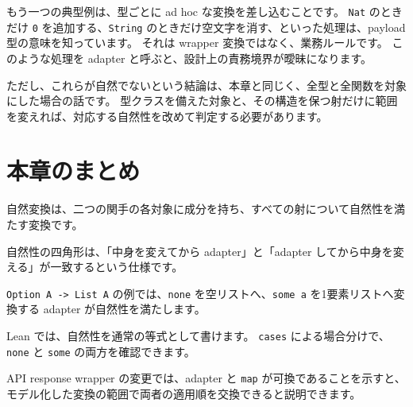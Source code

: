 もう一つの典型例は、型ごとに ad hoc な変換を差し込むことです。
\texttt{Nat} のときだけ \texttt{0} を追加する、\texttt{String} のときだけ空文字を消す、といった処理は、payload 型の意味を知っています。
それは wrapper 変換ではなく、業務ルールです。
このような処理を adapter と呼ぶと、設計上の責務境界が曖昧になります。

ただし、これらが自然でないという結論は、本章と同じく、全型と全関数を対象にした場合の話です。
型クラスを備えた対象と、その構造を保つ射だけに範囲を変えれば、対応する自然性を改めて判定する必要があります。

\section{本章のまとめ}

自然変換は、二つの関手の各対象に成分を持ち、すべての射について自然性を満たす変換です。

自然性の四角形は、「中身を変えてから adapter」と「adapter してから中身を変える」が一致するという仕様です。

\texttt{Option A -> List A} の例では、\texttt{none} を空リストへ、\texttt{some a} を1要素リストへ変換する adapter が自然性を満たします。

Lean では、自然性を通常の等式として書けます。
\texttt{cases} による場合分けで、\texttt{none} と \texttt{some} の両方を確認できます。

API response wrapper の変更では、adapter と \texttt{map} が可換であることを示すと、モデル化した変換の範囲で両者の適用順を交換できると説明できます。
